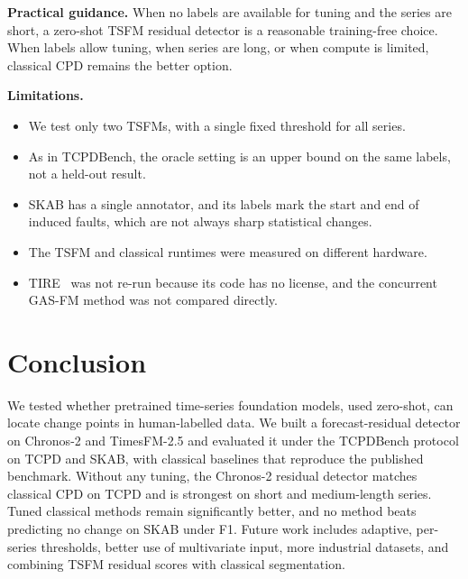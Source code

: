 \textbf{Practical guidance.} When no labels are available for tuning and the series are short, a zero-shot TSFM residual detector is a reasonable training-free choice. When labels allow tuning, when series are long, or when compute is limited, classical CPD remains the better option.

\textbf{Limitations.}
\begin{itemize}
\item We test only two TSFMs, with a single fixed threshold for all series.
\item As in TCPDBench, the oracle setting is an upper bound on the same labels, not a held-out result.
\item SKAB has a single annotator, and its labels mark the start and end of induced faults, which are not always sharp statistical changes.
\item The TSFM and classical runtimes were measured on different hardware.
\item TIRE~\cite{deryck2021tire} was not re-run because its code has no license, and the concurrent GAS-FM method was not compared directly.
\end{itemize}

\section{Conclusion}
We tested whether pretrained time-series foundation models, used zero-shot, can locate change points in human-labelled data. We built a forecast-residual detector on Chronos-2 and TimesFM-2.5 and evaluated it under the TCPDBench protocol on TCPD and SKAB, with classical baselines that reproduce the published benchmark. Without any tuning, the Chronos-2 residual detector matches classical CPD on TCPD and is strongest on short and medium-length series. Tuned classical methods remain significantly better, and no method beats predicting no change on SKAB under F1. Future work includes adaptive, per-series thresholds, better use of multivariate input, more industrial datasets, and combining TSFM residual scores with classical segmentation.
